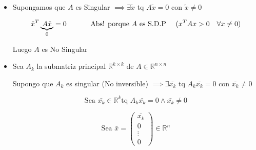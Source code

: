\begin{itemize}

\item Supongamos que $A$ es Singular \(\implies \exists \tilde{x} \) tq \(A\tilde{x} = 0 \) con \(\tilde{x} \neq 0 \)

\begin{equation}
\tilde{x}^{T}\underbrace{A\tilde{x}}_{0} = 0 \text{\hspace{3em} Abs! porque $A$ es S.D.P \hspace{1em}} (x^{T}Ax > 0 \hspace{1em}\forall x \neq 0)
\end{equation}


Luego $A$ es No Singular

\item Sea $A_{k}$ la submatriz principal $\mathbb{R}^{k\times k}$ de $A \in \mathbb{R}^{n \times n}$

Supongo que $A_{k}$ es singular (No inversible) $\implies \exists \bar{x_k}$ tq $A_k \bar{x_k} = 0$ con $\bar{x_k} \neq 0$

\[\text{Sea } \bar{x_{k}} \in \mathbb{R}^{k} \text{tq } A_{k} \bar{x_{k}} = 0  \land \bar{x_{k}} \neq 0 \]

\[ \text{Sea } \bar{x} = \begin{pmatrix} \bar{x_{k}} \\ 0 \\ \vdots \\ 0 \end{pmatrix} \in \mathbb{R}^{n} \]


\end{itemize}

